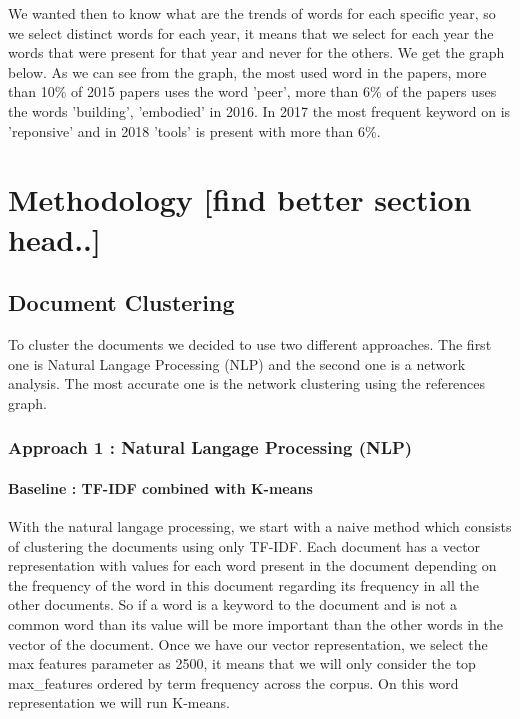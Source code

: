 \documentclass[journal,twocolumn]{IEEEtran}
\begin{document}
    We wanted then to know what are the trends of words for each specific
year, so we select distinct words for each year, it means that we select
for each year the words that were present for that year and never for
the others. We get the graph below. As we can see from the graph, the
most used word in the papers, more than 10\% of 2015 papers uses the
word 'peer', more than 6\% of the papers uses the words 'building',
'embodied' in 2016. In 2017 the most frequent keyword on is 'reponsive'
and in 2018 'tools' is present with more than 6\%.


    \begin{figure}
        \begin{center}\end{center}
        \caption{}
        \label{}
    \end{figure}
    
    \section{Methodology {[}find better section
head..{]}}\label{methodology-find-better-section-head..}

    \subsection{Document Clustering}\label{document-clustering}

To cluster the documents we decided to use two different approaches. The
first one is Natural Langage Processing (NLP) and the second one is a
network analysis. The most accurate one is the network clustering using
the references graph.

\subsubsection{Approach 1 : Natural Langage Processing
(NLP)}\label{approach-1-natural-langage-processing-nlp}

\paragraph{Baseline : TF-IDF combined with
K-means}\label{baseline-tf-idf-combined-with-k-means}

With the natural langage processing, we start with a naive method which
consists of clustering the documents using only TF-IDF. Each document
has a vector representation with values for each word present in the
document depending on the frequency of the word in this document
regarding its frequency in all the other documents. So if a word is a
keyword to the document and is not a common word than its value will be
more important than the other words in the vector of the document. Once
we have our vector representation, we select the max features parameter
as 2500, it means that we will only consider the top max\_features
ordered by term frequency across the corpus. On this word representation
we will run K-means.
\end{document}
